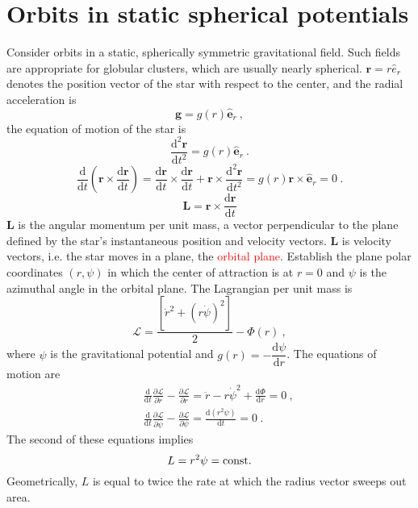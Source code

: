 \documentclass[12pt,a4paper]{article}
\renewcommand{\vec}[1]{\boldsymbol{#1}}
\newcommand{\dif}{\mathrm{d}}
\begin{document}
\section{Orbits in static spherical potentials}
Consider orbits in a static, spherically symmetric gravitational field. Such fields are appropriate for globular clusters, which are usually nearly spherical. $\vec{r} = r \hat{e}_r$ denotes the position vector of the star with respect to the center, and the radial acceleration is
 \begin{equation}
\vec{g} = g(r) \hat{\vec{e}}_r ~,
\end{equation}
the equation of motion of the star is
\begin{equation}
\frac{\dif^2 \vec{r}}{\dif t^2} = g(r) \hat{\vec{e}}_r ~.
\end{equation}
\begin{equation}
\frac{\dif }{\dif t} \left(\vec{r} \times \frac{\dif \vec{r} }{\dif t}  \right) = \frac{\dif \vec{r}}{\dif t} \times \frac{\dif \vec{r} }{\dif t} +\vec{r} \times \frac{\dif^2 \vec{r}}{\dif t^2} = g(r) \vec{r} \times \hat{\vec{e}}_r = 0 ~.
\end{equation}
\begin{equation}
\vec{L} = \vec{r} \times \frac{\dif \vec{r} }{\dif t}
\end{equation}
$\vec{L}$ is the angular momentum per unit mass, a vector perpendicular to the plane defined by the star's instantaneous position and velocity vectors. $\vec{L}$ is velocity vectors, i.e. the star moves in a plane, the \textcolor{red}{orbital plane}. Establish the plane polar coordinates $(r, \psi)$ in which the center of attraction is at $r = 0$ and $\psi$ is the azimuthal angle in the orbital plane. The Lagrangian per unit mass is
\begin{equation}
\mathcal L = \frac{[\dot{r}^2 +(r \dot{\psi})^2]}{2} -\Phi(r) ~,
\end{equation}
where $\psi$ is the gravitational potential and $g(r) = -\dfrac{\dif \psi}{\dif r}$. The equations of motion are
\begin{eqnarray*}
&& \frac{\dif }{\dif t} \frac{\partial \mathcal L}{\partial \dot{r} } -\frac{\partial \mathcal L}{\partial r} = \ddot{r} - r\dot{\psi}^2 +\frac{\dif \Phi}{\dif r} = 0 ~, \\
&& \frac{\dif }{\dif t} \frac{\partial \mathcal L}{\partial \dot{\psi} } -\frac{\partial \mathcal L}{\partial \psi} = \frac{\dif (r^2 \psi)}{\dif t} = 0 ~.
\end{eqnarray*}
The second of these equations implies 
\begin{equation}
L = r^2 \psi = \rm const.
\end{equation}
Geometrically, $L$ is equal to twice the rate at which the radius vector sweeps out area.
\end{document}
